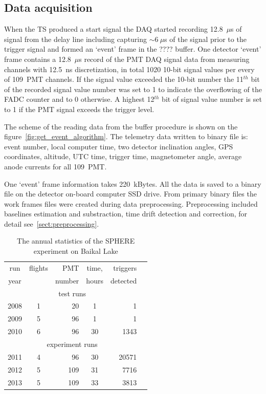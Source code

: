 \documentclass[final,5p,times,twocolumn]{elsarticle}
\begin{document}
\subsection{Data acquisition} 

When the TS produced a start signal the DAQ started recording 12.8~$\mu$s of signal from the delay line including capturing $\sim 6~\mu$s of the signal prior to the trigger signal and formed an `event' frame in the ???? buffer. One detector `event' frame contains a 12.8~$\mu$s record of the PMT DAQ signal data from measuring channels with 12.5~ns discretization, in total 1020 10-bit signal values per every of 109~PMT channels. If the signal value exceeded the 10-bit number the 11$^{th}$ bit of the recorded signal value number was set to 1 to indicate the overflowing of the FADC counter and to 0 otherwise. A highest 12$^{th}$ bit of signal value number is set to 1 if the PMT signal exceeds the trigger level. 

The scheme of the reading data from the buffer procedure is shown on the figure~\ref{fig:get_event_algorithm}. 
The telemetry data written to binary file is: event number, local computer time, two detector inclination angles, GPS coordinates, altitude, UTC time, trigger time, magnetometer angle, average anode currents for all 109~PMT. 

One `event' frame information takes 220~kBytes. All the data is saved to a binary file on the detector on-board computer SSD drive. From primary binary files the work frames files were created during data preprocessing. Preprocessing included baselines estimation and substraction, time drift detection and correction, for detail see~\ref{sect:preprocessing}.


\begin{table}[b]
\centering
\caption{The annual statistics of the SPHERE experiment on Baikal Lake}
\label{tab:statistics}
\vspace{1pc}
\begin{tabular}{|c||c|r|c|r|r|}
\hline
run  & flights & PMT    & time, & triggers \\ 
year &         & number & hours & detected \\ 
\hline \hline
\multicolumn{5}{|c|}{test runs} \\
\hline
2008 & 1 &  20 &  1 &     1 \\ 
2009 & 5 &  96 &  1 &     1 \\ 
2010 & 6 &  96 & 30 &  1343 \\
\hline
\multicolumn{5}{|c|}{experiment runs} \\
\hline
2011 & 4 &  96 & 30 & 20571 \\
2012 & 5 & 109 & 31 &  7716 \\
2013 & 5 & 109 & 33 &  3813 \\
\hline
\end{tabular}
\end{table}
\end{document}
